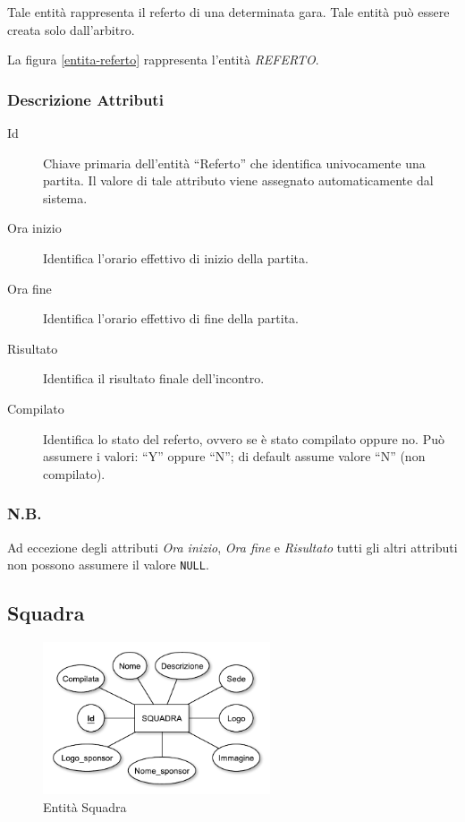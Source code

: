 		Tale entità rappresenta il referto di una determinata gara. Tale entità può essere creata solo dall'arbitro.
		
		La figura \ref{entita-referto} rappresenta l'entità \emph{REFERTO}.
		
		\subsubsection*{Descrizione Attributi}
		
		\begin{description}
			
			\item[Id]
			Chiave primaria dell'entità ``Referto'' che identifica univocamente una partita. Il valore di tale attributo viene assegnato automaticamente dal sistema.
			
			\item[Ora inizio]
			Identifica l'orario effettivo di inizio della partita.
			
			\item[Ora fine]
			Identifica l'orario effettivo di fine della partita.
			
			\item[Risultato]
			Identifica il risultato finale dell'incontro.
			
			\item[Compilato]
			Identifica lo stato del referto, ovvero se è stato compilato oppure no. Può assumere i valori: ``Y'' oppure ``N''; di default assume valore ``N'' (non compilato).
			
		\end{description}
		
		\subsubsection*{N.B.}
		Ad eccezione degli attributi \emph{Ora inizio}, \emph{Ora fine} e \emph{Risultato} tutti gli altri attributi non possono assumere il valore \texttt{NULL}.
	
	\subsection{Squadra}
	
		\begin{figure}[h]
			\centering
			\includegraphics[width=0.6\textwidth]
			{immagini/09-squadra}
			
			\caption{Entità Squadra}
			\label{entita-squadra}
		\end{figure}
		
